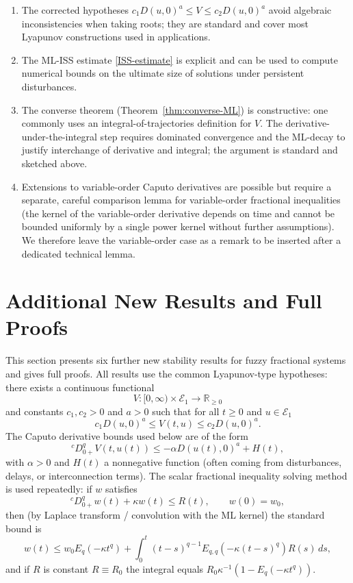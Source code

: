 \documentclass[11pt,a4paper]{article}
\theoremstyle{plain}
\theoremstyle{definition}
\theoremstyle{remark}
\newcommand{\E}{\mathcal{E}_1}
\newcommand{\Haus}{D}
\begin{document}
	\begin{enumerate}
		\item The corrected hypotheses \(c_1\Haus(u,0)^a\le V\le c_2\Haus(u,0)^a\) avoid algebraic inconsistencies when taking roots; they are standard and cover most Lyapunov constructions used in applications.
		\item The ML-ISS estimate \eqref{ISS-estimate} is explicit and can be used to compute numerical bounds on the ultimate size of solutions under persistent disturbances.
		\item The converse theorem (Theorem~\ref{thm:converse-ML}) is constructive: one commonly uses an integral-of-trajectories definition for \(V\). The derivative-under-the-integral step requires dominated convergence and the ML-decay to justify interchange of derivative and integral; the argument is standard and sketched above.
		\item Extensions to variable-order Caputo derivatives are possible but require a separate, careful comparison lemma for variable-order fractional inequalities (the kernel of the variable-order derivative depends on time and cannot be bounded uniformly by a single power kernel without further assumptions). We therefore leave the variable-order case as a remark to be inserted after a dedicated technical lemma.
	\end{enumerate}
	
	\section{Additional New Results and Full Proofs}\label{sec:more-results}
	
	This section presents six further new stability results for fuzzy fractional systems and gives full proofs.  All results use the common Lyapunov-type hypotheses: there exists a continuous functional
	\[
	V:[0,\infty)\times\E\to\mathbb{R}_{\ge0}
	\]
	and constants \(c_1,c_2>0\) and \(a>0\) such that for all \(t\ge0\) and \(u\in\E\)
	\begin{equation}\label{V-power-bounds}
		c_1\Haus(u,0)^a \le V(t,u) \le c_2\Haus(u,0)^a .
	\end{equation}
	The Caputo derivative bounds used below are of the form
	\[
	{}^cD_{0+}^q V(t,u(t)) \le -\alpha \Haus(u(t),0)^a + H(t),
	\]
	with \(\alpha>0\) and \(H(t)\) a nonnegative function (often coming from disturbances, delays, or interconnection terms). The scalar fractional inequality solving method is used repeatedly:
	if \(w\) satisfies
	\[
	{}^cD_{0+}^q w(t)+\kappa w(t)\le R(t),\qquad w(0)=w_0,
	\]
	then (by Laplace transform / convolution with the ML kernel) the standard bound is
	\[
	w(t)\le w_0 E_q(-\kappa t^q) + \int_0^t (t-s)^{q-1} E_{q,q}(-\kappa (t-s)^q)R(s)\,ds,
	\]
	and if \(R\) is constant \(R\equiv R_0\) the integral equals \(R_0\kappa^{-1}(1-E_q(-\kappa t^q))\).
	
\end{document}
